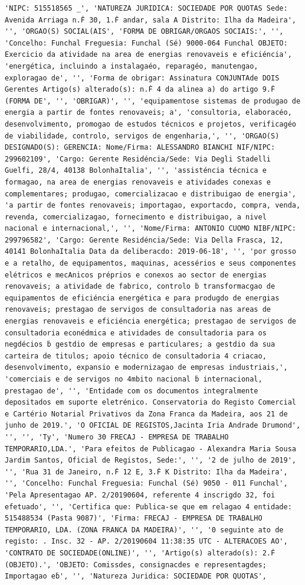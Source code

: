 \documentclass[
  12pt,
]{article}
\begin{document}
\begin{verbatim}
'NIPC: 515518565 _', 'NATUREZA JURIDICA: SOCIEDADE POR QUOTAS Sede: Avenida Arriaga n.Ḟ 30, 1.Ḟ andar, sala A Distrito: Ilha da Madeira', '', 'ORGAO(S) SOCIAL(AIS', 'FORMA DE OBRIGAR/ORGAOS SOCIAIS:', '', 'Concelho: Funchal Freguesia: Funchal (Sé) 9000-064 Funchal OBJETO: Exercicio da atividade na area de energias renovaveis e eficiéncia', 'energética, incluindo a instalagaéo, reparagéo, manutengao, exploragao de', '', 'Forma de obrigar: Assinatura CONJUNTAde DOIS Gerentes Artigo(s) alterado(s): n.Ḟ 4 da alinea a) do artigo 9.Ḟ (FORMA DE', '', 'OBRIGAR)', '', 'equipamentose sistemas de produgao de energia a partir de fontes renovaveis; a', 'consultoria, elaboracéo, desenvolvimento, promogao de estudos técnicos e projetos, verificagéo de viabilidade, controlo, servigos de engenharia,', '', 'ORGAO(S) DESIGNADO(S): GERENCIA: Nome/Firma: ALESSANDRO BIANCHI NIF/NIPC: 299602109', 'Cargo: Gerente Residéncia/Sede: Via Degli Stadelli Guelfi, 28/4, 40138 BolonhaItalia', '', 'assisténcia técnica e formagao, na area de energias renovaveis e atividades conexas e complementares; produgao, comercializacao e distribuigao de energia', 'a partir de fontes renovaveis; importagao, exportacdo, compra, venda, revenda, comercializagao, fornecimento e distribuigao, a nivel nacional e internacional,', '', 'Nome/Firma: ANTONIO CUOMO NIBF/NIPC: 299796582', 'Cargo: Gerente Residéncia/Sede: Via Della Frasca, 12, 40141 BolonhaItalia Data da deliberacdo: 2019-06-18', '', 'por grosso e a retalho, de equipamentos, maquinas, acessérios e seus componentes elétricos e mecAnicos préprios e conexos ao sector de energias renovaveis; a atividade de fabrico, controlo ḃ transformacgao de equipamentos de eficiéncia energética e para produgdo de energias renovaveis; prestagao de servigos de consultadoria nas areas de energias renovaveis e eficiéncia energética; prestagao de servigos de consultadoria econédmica e atividades de consultadoria para os negdécios ḃ gestdio de empresas e particulares; a gestdio da sua carteira de titulos; apoio técnico de consultadoria 4 criacao, desenvolvimento, expansio e modernizagao de empresas industriais,', 'comerciais e de servigos no 4mbito nacional ḃ internacional, prestagao de', '', 'Entidade com os documentos integralmente depositados em suporte eletrénico. Conservatoria do Registo Comercial e Cartério Notarial Privativos da Zona Franca da Madeira, aos 21 de junho de 2019.', 'O OFICIAL DE REGISTOS,Jacinta Iria Andrade Drumond', '', '', 'Ty', 'Numero 30 FRECAJ - EMPRESA DE TRABALHO TEMPORARIO,LDA.', 'Para efeitos de Publicagao - Alexandra Maria Sousa Jardim Santos, Oficial de Registos, Sede:', '', '2 de julho de 2019', '', 'Rua 31 de Janeiro, n.Ḟ 12 E, 3.Ḟ K Distrito: Ilha da Madeira', '', 'Concelho: Funchal Freguesia: Funchal (Sé) 9050 - 011 Funchal', 'Pela Apresentagao AP. 2/20190604, referente 4 inscrigdo 32, foi efetuado', '', 'Certifica que: Publica-se que em relagao 4 entidade: 515488534 (Pasta 9087)', 'Firma: FRECAJ - EMPRESA DE TRABALHO TEMPORARIO, LDA. (ZONA FRANCA DA MADEIRA)', '', '0 seguinte ato de registo: . Insc. 32 - AP. 2/20190604 11:38:35 UTC - ALTERACOES AO', 'CONTRATO DE SOCIEDADE(ONLINE)', '', 'Artigo(s) alterado(s): 2.Ḟ (OBJETO).', 'OBJETO: Comissdes, consignacdes e representagdes; Importagao eḃ', '', 'Natureza Juridica: SOCIEDADE POR QUOTAS', 
\end{verbatim}
\end{document}
